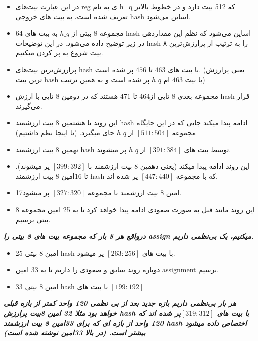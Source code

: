 \begin{itemize}
	\item
	      در این عبارت بیت‌های reg ی به نام
	      h\_q 
	      که 512 بیت دارد و در خطوط بالاتر تعریف شده است، به بیت های خروجی hash اساین می‌شود.
	\item
	      64 مجموعه 8 بیتی از $h\_q$ به بیت های hash اساین می‌شود که نظم این مقداردهی در زیر توضیح داده می‌شود. در این توضیحات hash را به ترتیب از پرارزش‌ترین ۸ بیت شروع به پر کردن میکنیم.
	\item
	      پرارزش‌ترین بیت‌های hash با بیت های $463$ تا $456$ پر شده است. (یعنی پرارزش ترین بیت hash با بیت $463$ ام $h\_q$ پر شده است و به همین ترتیب)
	\item
	      مجموعه بعدی 8 تایی از$464$ تا $471$ هستند که در دومین 8 تایی با ارزش hash قرار می‌گیرند.
	\item
	      این روند تا هشتمین 8 بیت ارزشمند hash ادامه پیدا میکند جایی که در این جایگاه مجموعه $[511:504]$ از $h\_q$ جای میگیرد. (تا اینجا نظم داشتیم)
	\item
	      نهمین 8 بیت ارزشمند hash توسط بیت های $[391:384]$ از $h\_q$ پر میشوند.
	\item
	      این روند ادامه پیدا میکند (یعنی دهمین 8 بیت ارزشمند با $[399:392]$ پر میشوند).
	      تا 16امین 8 بیت ارزشمند hash که با مجموعه $[447:440]$ پر شده اند.
	\item
	      17امین 8 بیت ارزشمند با مجموعه $[327:320]$ پر میشود.
	\item
	      این روند مانند قبل به صورت صعودی ادامه پیدا خواهد کرد تا به 25 امین مجموعه 8 بیتی برسیم.
	      
\end{itemize}

\textit{\textbf{درواقع هر 8 بار که مجموعه بیت های 8 بیتی را assign میکنیم، یک بی‌نظمی داریم.
}}
\begin{itemize}
	\item
	      25 امین 8 بیتی hash با بیت های $[263:256]$ پر میشود.
	\item
	      دوباره روند سابق و صعودی را داریم تا به 33 امین assignment برسیم.
	\item
	      33 امین 8 بیتی hash با بیت های $[199:192]$
	      
\end{itemize}

\textit{\textbf{هر بار بی‌نظمی داریم بازه جدید بعد از بی نظمی 120 واحد کمتر از بازه قبلی خواهد بود مثلا 32 امین 8بیت پرارزش hash با بیت های $[319:312] $پر شده اند که 120 واحد از بازه ای که برای 33امین 8 بیت ارزشمند hash اختصاص داده میشود بیشتر است. (در بالا 33امین نوشته شده است)}}

